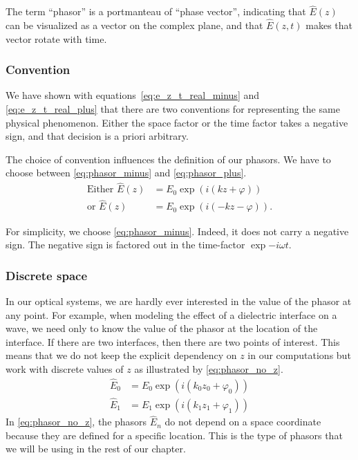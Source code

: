 The term ``phasor'' is a portmanteau of ``phase vector'', indicating that $\hat{E}(z)$ can be visualized as a vector on the complex plane, and that $\hat{E}(z, t)$ makes that vector rotate with time.

\subsubsection{Convention}
We have shown with equations~\ref{eq:e_z_t_real_minus} and \ref{eq:e_z_t_real_plus} that there are two conventions for representing the same physical phenomenon.
Either the space factor or the time factor takes a negative sign, and that decision is a priori arbitrary.

The choice of convention influences the definition of our phasors.
We have to choose between
\cref{eq:phasor_minus} and \cref{eq:phasor_plus}.
\begin{subequations}
    \begin{align}
        \text{Either }
        \hat{E}(z) &= E_0 \exp(i(kz+\varphi))
        \label{eq:phasor_minus}
        \\
        \text{or }
        \hat{E}(z) &= E_0 \exp(i(-kz-\varphi))
        \text{.}
         \label{eq:phasor_plus}
    \end{align}    
\end{subequations}

For simplicity, we choose \cref{eq:phasor_minus}.
Indeed, it does not carry a negative sign.
The negative sign is factored out in the time-factor $\exp{-i \omega t}$.


\subsubsection{Discrete space}
In our optical systems, we are hardly ever interested in the value of the phasor at any point.
For example, when modeling the effect of a dielectric interface on a wave, we need only to know the value of the phasor at the location of the interface.
If there are two interfaces, then there are two points of interest.
This means that we do not keep the explicit dependency on $z$ in our computations but work with discrete values of $z$ as illustrated by \cref{eq:phasor_no_z}.
\begin{equation}
    \begin{aligned}
        \hat{E}_0 &= E_0 \exp(i(k_0 z_0 + \varphi_0))
        \\
        \hat{E}_1 &= E_1 \exp(i(k_1 z_1 + \varphi_1))
    \end{aligned}
    \label{eq:phasor_no_z}
\end{equation}
In \cref{eq:phasor_no_z}, the phasors $\hat{E}_n$ do not depend on a space coordinate because they are defined for a specific location.
This is the type of phasors that we will be using in the rest of our chapter.

